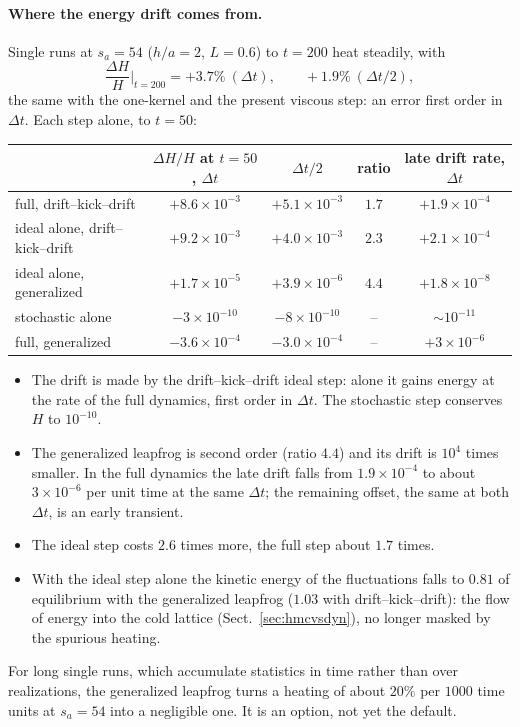 \documentclass[11pt,aps,preprint,nofootinbib,superscriptaddress,tightenlines]{revtex4-2}
\def\st{\begin{equation}}
\def\stp{\end{equation}}
\def\Sect#1{Sect.~\ref{#1}}
\let\oldparagraph\paragraph
\renewcommand{\paragraph}{\par\bigskip\oldparagraph}
\begin{document}
\paragraph{Where the energy drift comes from.}  Single runs at $s_a=54$ ($h/a=2$, $L=0.6$) to $t=200$ heat steadily, with
\st
\frac{\Delta H}{H}\Big|_{t=200}=+3.7\%\ (\Delta t),\qquad +1.9\%\ (\Delta t/2),
\stp
the same with the one-kernel and the present viscous step: an error first order in $\Delta t$.  Each step alone, to $t=50$:
\begin{center}
\begin{tabular}{lcccc}
\hline
 & $\Delta H/H$ at $t=50$, $\Delta t$ & $\Delta t/2$ & ratio & late drift rate, $\Delta t$ \\ \hline
full, drift--kick--drift & $+8.6\times10^{-3}$ & $+5.1\times10^{-3}$ & $1.7$ & $+1.9\times10^{-4}$ \\
ideal alone, drift--kick--drift & $+9.2\times10^{-3}$ & $+4.0\times10^{-3}$ & $2.3$ & $+2.1\times10^{-4}$ \\
ideal alone, generalized & $+1.7\times10^{-5}$ & $+3.9\times10^{-6}$ & $4.4$ & $+1.8\times10^{-8}$ \\
stochastic alone & $-3\times10^{-10}$ & $-8\times10^{-10}$ & -- & $\sim10^{-11}$ \\
full, generalized & $-3.6\times10^{-4}$ & $-3.0\times10^{-4}$ & -- & $+3\times10^{-6}$ \\
\hline
\end{tabular}
\end{center}
\begin{itemize}
\item The drift is made by the drift--kick--drift ideal step: alone it gains energy at the rate of the full dynamics, first
  order in $\Delta t$.  The stochastic step conserves $H$ to $10^{-10}$.
\item The generalized leapfrog is second order (ratio $4.4$) and its drift is $10^4$ times smaller.  In the full dynamics the late
  drift falls from $1.9\times10^{-4}$ to about $3\times10^{-6}$ per unit time at the same $\Delta t$; the remaining offset, the same at both
  $\Delta t$, is an early transient.
\item The ideal step costs $2.6$ times more, the full step about $1.7$ times.
\item With the ideal step alone the kinetic energy of the fluctuations falls to $0.81$ of equilibrium with the generalized
  leapfrog ($1.03$ with drift--kick--drift): the flow of energy into the cold lattice (\Sect{sec:hmcvsdyn}), no longer masked
  by the spurious heating.
\end{itemize}
For long single runs, which accumulate statistics in time rather than over realizations, the generalized leapfrog turns a
heating of about $20\%$ per $1000$ time units at $s_a=54$ into a negligible one.  It is an option, not yet the default.
\end{document}
